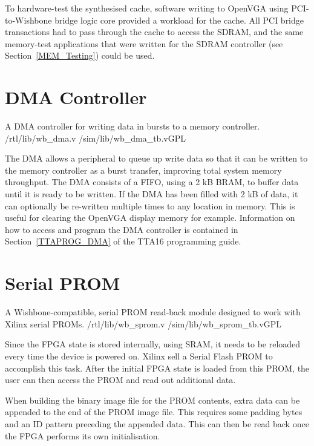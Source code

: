 To hardware-test the synthesised cache, software writing to OpenVGA using
PCI-to-Wishbone bridge logic core provided a workload for the cache. All PCI
bridge transactions had to pass through the cache to access the SDRAM, and the
same memory-test applications that were written for the SDRAM controller (see
Section~\ref{MEM_Testing}) could be used.



\section{DMA Controller}
\label{MEM_DMA}

{A DMA controller for writing data in bursts to a memory controller.}
{/rtl/lib/wb\_dma.v} {/sim/lib/wb\_dma\_tb.v}{GPL}

The DMA allows a peripheral to queue up write data so that it can be written to
the memory controller as a burst transfer, improving total system memory
throughput. The DMA consists of a FIFO, using a 2 kB BRAM, to buffer data until
it is ready to be written. If the DMA has been filled with 2 kB of data, it can
optionally be re-written multiple times to any location in memory. This is useful
for clearing the OpenVGA display memory for example. Information on how to access
and program the DMA controller is contained in Section~\ref{TTAPROG_DMA} of the
TTA16 programming guide.


\section{Serial PROM}
\label{Serial_PROM}

{A Wishbone-compatible, serial PROM read-back module designed to work with Xilinx
serial PROMs.} {/rtl/lib/wb\_sprom.v} {/sim/lib/wb\_sprom\_tb.v}{GPL}

Since the FPGA state is stored internally, using SRAM, it needs to be reloaded
every time the device is powered on. Xilinx sell a Serial Flash PROM to
accomplish this task. After the initial FPGA state is loaded from this PROM,
the user can then access the PROM and read out additional data.

When building the binary image file for the PROM contents, extra data can be
appended to the end of the PROM image file. This requires some padding
bytes and an ID pattern preceding the appended data. This can then be read back
once the FPGA performs its own initialisation.

